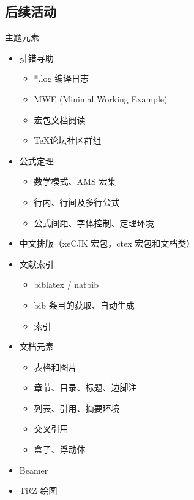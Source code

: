 \documentclass{beamer}
\newcommand{\opt}[1]{{\color{gray} #1}}
\begin{document}
\subsection{后续活动}
\begin{frame}[allowframebreaks]{主题元素}
\begin{Form}
    \begin{itemize}[label = {\CheckBox[width=.12in,height=.12in,bordercolor=blue]{}}]
    \item 排错寻助
        \begin{itemize}[label = {\CheckBox[width=.1in,height=.1in,bordercolor=cyan]{}}]
        \item \opt{*.log 编译日志}
        \item MWE (Minimal Working Example)
        \item 宏包文档阅读
        \item \TeX 论坛社区群组
        \end{itemize}
    \item 公式定理
        \begin{itemize}[label = {\CheckBox[width=.1in,height=.1in,bordercolor=cyan]{}}]
        \item 数学模式、AMS 宏集
        \item 行内、行间及多行公式
        \item \opt{公式间距、字体控制、定理环境}
        \end{itemize}
    \item 中文排版（xeCJK 宏包，ctex 宏包和文档类）
    \item 文献索引
        \begin{itemize}[label = {\CheckBox[width=.1in,height=.1in,bordercolor=cyan]{}}]
        \item biblatex / natbib
        \item bib 条目的获取、自动生成
        \item \opt{索引}
        \end{itemize}
    \item 文档元素
        \begin{itemize}[label = {\CheckBox[width=.1in,height=.1in,bordercolor=cyan]{}}]
        \item 表格和图片
        \item 章节、目录、标题、边脚注
        \item 列表、引用、摘要环境
        \item 交叉引用
        \item \opt{盒子、浮动体}
        \end{itemize}
    \item \opt{Beamer}
    \item \opt{Ti\emph{k}Z 绘图}
    \end{itemize}
\end{Form}
\end{frame}
\end{document}
